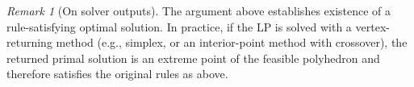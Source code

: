 \documentclass{article}
\theoremstyle{plain}
\newtheorem{theorem}{Theorem}[section]
\theoremstyle{definition}
\theoremstyle{remark}
\newtheorem{remark}[theorem]{Remark}
\begin{document}
\begin{remark}[On solver outputs]
The argument above establishes existence of a rule-satisfying optimal solution. In practice, if the LP is solved with a
vertex-returning method (e.g., simplex, or an interior-point method with crossover), the returned primal solution is an extreme
point of the feasible polyhedron and therefore satisfies the original rules as above.
\end{remark}



\end{document}

